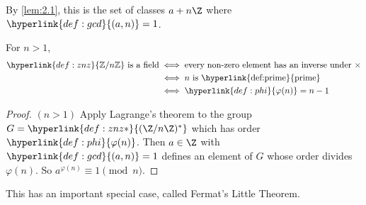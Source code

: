 \documentclass{article}
\begin{document}
By \cref{lem:2.1}, this is the set of classes $a + n \Z$ where $\hyperlink{def:gcd}{(a, n)} = 1$.

\begin{remark}
    For $n>1$,
    \begin{align*}
        \hyperlink{def:znz}{\mathbb{Z}/n\mathbb{Z}}\text{ is a field} & \iff \text{every non-zero element has an inverse under } \times \\
                                                                      &\iff n\text{ is \hyperlink{def:prime}{prime}} \\
                                                                      &\iff \hyperlink{def:phi}{\varphi(n)} = n-1
    \end{align*}
\end{remark}


\begin{proof}
    $(n>1)$ Apply Lagrange's theorem to the group $G = \hyperlink{def:znz*}{(\Z/n\Z)^*}$ which has order $\hyperlink{def:phi}{\varphi(n)}$.
    Then $a \in \Z$ with $\hyperlink{def:gcd}{(a, n)} = 1$ defines an element of $G$ whose order divides $\varphi(n)$. So $a^{\varphi(n)} \equiv 1 \pmod{n}$.
\end{proof}

This has an important special case, called Fermat's Little Theorem.
\end{document}

